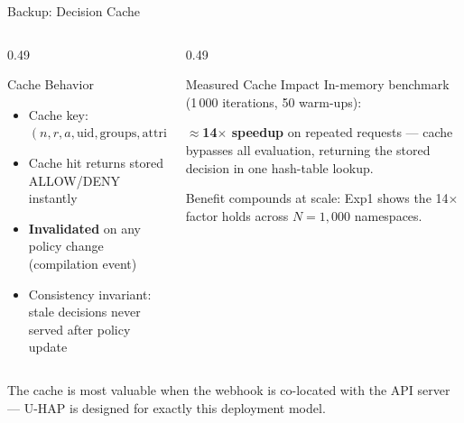 \documentclass[aspectratio=169,10pt]{beamer}
\newcommand{\tightitems}{%
  \setlength{\topsep}{1pt}%
  \setlength{\itemsep}{2pt}%
  \setlength{\parsep}{0pt}%
  \setlength{\parskip}{0pt}%
}
\newcommand{\highlightbanner}[1]{%
  \begin{center}
  \begin{tcolorbox}[colback=uhapGray,colframe=uhapGray,
                    boxrule=0pt,arc=1mm,
                    left=6pt,right=6pt,top=1pt,bottom=1pt,
                    width=0.97\linewidth,
                    borderline west={2pt}{0pt}{uhapTeal}]
  \tiny\color{uhapNavyD}#1
  \end{tcolorbox}
  \end{center}}
\begin{document}
\begin{frame}[t,noframenumbering]{Backup: Decision Cache}
\vspace{3pt}
\begin{columns}[T,onlytextwidth]
\begin{column}{0.49\textwidth}
\begin{callout}{Cache Behavior}
\begin{itemize}\tightitems
\item Cache key: $(n, r, a, \mathrm{uid}, \mathrm{groups}, \mathrm{attributes})$
\item Cache hit returns stored ALLOW/DENY instantly
\item \textbf{Invalidated} on any policy change (compilation event)
\item Consistency invariant: stale decisions never served after policy update
\end{itemize}
\end{callout}
\end{column}
\begin{column}{0.49\textwidth}
\begin{callout}{Measured Cache Impact}
In-memory benchmark (1\,000 iterations, 50 warm-ups):

\textbf{$\approx$14$\times$ speedup} on repeated requests ---
cache bypasses all evaluation, returning the stored decision in one hash-table lookup.

Benefit compounds at scale: Exp1 shows the 14$\times$ factor
holds across $N=1{,}000$ namespaces.
\end{callout}
\end{column}
\end{columns}
\vspace{4pt}
\highlightbanner{The cache is most valuable when the webhook is co-located with the API server --- U-HAP is designed for exactly this deployment model.}
\end{frame}
\end{document}
